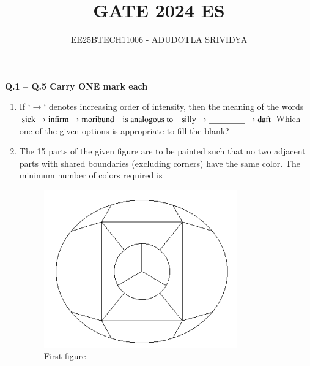 \documentclass[journal]{IEEEtran}
\numberwithin{equation}{enumi}
\numberwithin{figure}{enumi}
\begin{document}

\vspace{3cm}

\title{GATE 2024 ES}
\author{EE25BTECH11006 - ADUDOTLA SRIVIDYA}
\maketitle
\noindent
\textbf{Q.1 -- Q.5 Carry ONE mark each}

\vspace{0.5cm}

\begin{enumerate}[start=1, label={Q\arabic*.}]

\item If `$\rightarrow$` denotes increasing order of intensity, then the meaning of the words
$ \text{sick} \rightarrow \text{infirm} \rightarrow \text{moribund}
\quad \text{is analogous to} \quad
\text{silly} \rightarrow \underline{\hspace{1.5cm}} \rightarrow \text{daft} $
Which one of the given options is appropriate to fill the blank?
\begin{enumerate} 
  \end{enumerate}
\item The 15 parts of the given figure are to be painted such that no two adjacent parts with shared boundaries (excluding corners) have the same color. The minimum number of colors required is
\begin{figure}[H]
    \centering
    \includegraphics[width=0.3\linewidth]{figs/fig1.png}
    \caption{First figure}
    \label{fig:first}
\end{figure}
\begin{enumerate} 
  \end{enumerate}
  

\end{enumerate}
\end{document}
